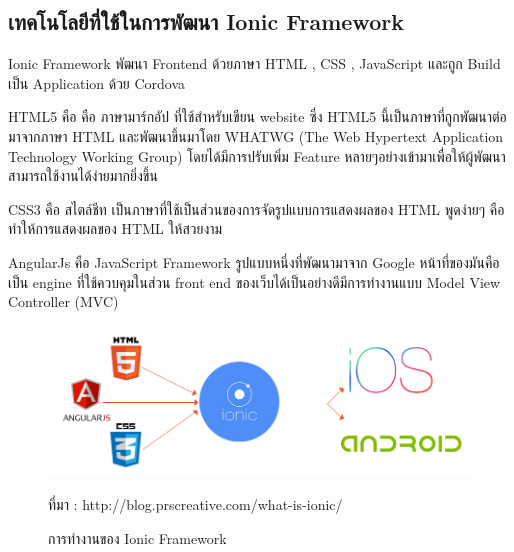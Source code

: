 		\subsection{เทคโนโลยีที่ใช้ในการพัฒนา Ionic Framework}
		Ionic Framework พัฒนา Frontend ด้วยภาษา HTML , CSS , JavaScript และถูก Build เป็น Application ด้วย Cordova
		\item HTML5  คือ คือ ภาษามาร์กอัป ที่ใช้สำหรับเขียน website ซึ่ง HTML5 นี้เป็นภาษาที่ถูกพัฒนาต่อมาจากภาษา HTML และพัฒนาขึ้นมาโดย WHATWG (The Web Hypertext Application Technology Working Group) โดยได้มีการปรับเพิ่ม Feature หลายๆอย่างเข้ามาเพื่อให้ผู้พัฒนาสามารถใช้งานได้ง่ายมากยิ่งขึ้น
		\item CSS3  คือ สไตล์ชีท เป็นภาษาที่ใช้เป็นส่วนของการจัดรูปแบบการแสดงผลของ HTML พูดง่ายๆ คือทำให้การแสดงผลของ HTML ให้สวยงาม
		\item AngularJs คือ JavaScript Framework  รูปแบบหนึ่งที่พัฒนามาจาก Google หน้าที่ของมันคือเป็น engine ที่ใช้ควบคุมในส่วน front end ของเว็บได้เป็นอย่างดีมีการทำงานแบบ Model View Controller (MVC)
		
		\begin{figure}[H]
			\centering
			\includegraphics[width=0.8\columnwidth]{Figures/2/ionic1}
			\caption{การทำงานของ Ionic Framework}{ที่มา : http://blog.prscreative.com/what-is-ionic/}
			\label{Fig:ionic}
		\end{figure}

